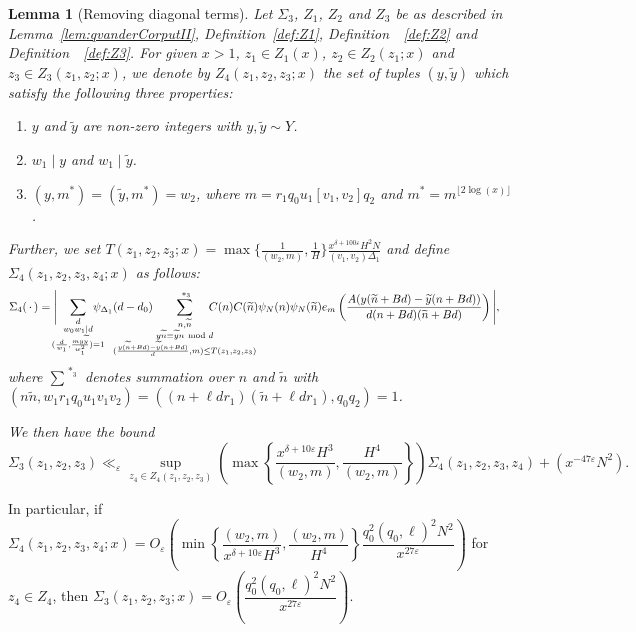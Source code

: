 \documentclass{amsart}
\newtheorem{lemma}{Lemma}
\numberwithin{equation}{section}
\begin{document}
\begin{lemma}[Removing diagonal terms]\label{lem:diagonalII}
Let $\Sigma_3$, $Z_1$, $Z_2$ and  $Z_3$ be as described in Lemma~{\rm \ref{lem:qvanderCorputII}}, Definition~{\rm \ref{def:Z1}}, Definition~~{\rm \ref{def:Z2}} and Definition~~{\rm \ref{def:Z3}}.
 For given $x>1$, $z_1 \in Z_1(x)$, $z_2 \in Z_2(z_1;x)$ and $z_3 \in Z_3(z_1,z_2;x)$, we denote by $Z_4(z_1,z_2,z_3;x)$ the set of tuples  
$
(y, \widetilde{y})
$ which satisfy the following three properties: 
\begin{enumerate}[{\rm(i)}]
\item $y$ and $\widetilde{y}$ are non-zero integers with $y, \widetilde{y} \sim Y$.
\item $w_1 \mid y$ and $w_1 \mid \widetilde{y}$.
\item$(y,m^*)=(\widetilde{y},m^*)=w_2$, where 
 $m = r_1q_0u_1[v_1,v_2]q_2$ and $m^* = m^{\lfloor 2 \log(x) \rfloor}$.
\end{enumerate}
Further, we set $T(z_1,z_2,z_3;x)= \max\{\tfrac{1}{(w_2,m)}, \tfrac{1}{H}\} \tfrac{x^{\delta+100\varepsilon}H^2 N}{(v_1,v_2)\Delta_1}$ and define $\Sigma_4(z_1,z_2,z_3,z_4;x)$ as follows:
 \begin{align*}
&\Sigma_4(\, \cdot \,)= \Bigg|\!\!\!\!\sum_{\substack{d \\ w_0w_1 \mid d  \\  (\frac{d}{w_1}, \frac{my\widetilde{y}}{w_1^2})=1}}\!\!\!\!\!\!\!\psi_{\Delta_1}(d-d_0) \!\!\!\!\!\!\!\!\!\!\!\!\!\!\!\!\!\!\!\!\!\!\sum_{\substack{n, \widetilde{n}   \\ y\widetilde{n} \equiv 
\widetilde{y}n  \mbox{ \scriptsize mod } d \\ (\frac{y (\widetilde{n} +Bd)-\widetilde{y}(n+Bd)}{d},m ) \leq T(z_1,z_2,z_3)}}^{\,\,*_3}  \!\!\!\!\!\!\!\!\!\!\!\!\!\!\!\!\!\!\!\!\!\!\!\!\!\! C(n)  C(\widetilde{n})\psi_N(n)\psi_N(\widetilde{n}) e_{m}\left(\dfrac{A (y(\widetilde{n}+B d)-  \widetilde{y}(n+B d))}{d(n+B d)(\widetilde{n}+B d)}\right)\Bigg|,
\end{align*}
where $\sum\limits^{\,\,*_3}$ denotes summation over $n$ and $\widetilde{n}$ with $ (n\widetilde{n},w_1 r_1 q_0 u_1 v_1 v_2)=((n+\ell dr_1)(\widetilde{n}+\ell d r_1), q_0q_2)=1  $.

\vspace{3mm}
We then have the bound $$\Sigma_3(z_1,z_2,z_3)  \ll_\varepsilon  \sup_{z_4 \in Z_4(z_1,z_2,z_3)}  \left(\max\left\{\dfrac{x^{\delta+10\varepsilon}H^3}{(w_2,m)}, \dfrac{H^4}{ (w_2,m)}\right\}\right) \Sigma_4(z_1,z_2,z_3,z_4) + (x^{-47\varepsilon}   N^2).$$
\end{lemma}
In particular, if $\Sigma_4(z_1,z_2,z_3,z_4;x) = O_{\varepsilon}\!\left(\min\left\{\dfrac{ (w_2,m)}{x^{\delta+10\varepsilon}H^3}, \dfrac{ (w_2,m)}{H^4}\right\}\dfrac{q_0^2(q_0,\ell)^2 N^2}{x^{27\varepsilon}}\right)$ for $z_4\in Z_4$, then $\Sigma_3(z_1,z_2,z_3;x) = O_{\varepsilon}\!\left(\dfrac{q_0^2(q_0,\ell)^2 N^2}{x^{27\varepsilon}}\right)$.
\end{document}
